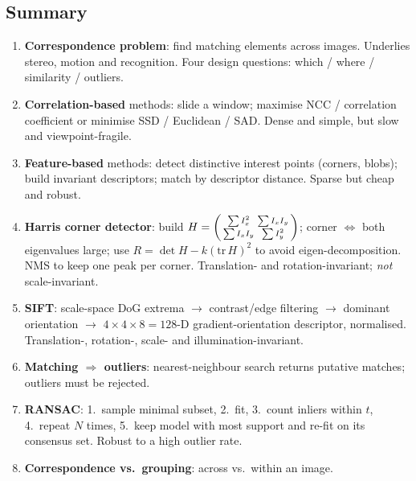\bigseparator

\subsection{Summary}

\begin{keybox}
\begin{enumerate}
  \item \textbf{Correspondence problem}: find matching elements across images. Underlies stereo, motion and recognition. Four design questions: which / where / similarity / outliers.
  \item \textbf{Correlation-based} methods: slide a window; maximise NCC / correlation coefficient or minimise SSD / Euclidean / SAD. Dense and simple, but slow and viewpoint-fragile.
  \item \textbf{Feature-based} methods: detect distinctive interest points (corners, blobs); build invariant descriptors; match by descriptor distance. Sparse but cheap and robust.
  \item \textbf{Harris corner detector}: build $H = \begin{psmallmatrix}\sum I_x^2 & \sum I_x I_y \\ \sum I_x I_y & \sum I_y^2\end{psmallmatrix}$; corner $\Leftrightarrow$ both eigenvalues large; use $R = \det H - k(\mathrm{tr}\, H)^2$ to avoid eigen-decomposition. NMS to keep one peak per corner. Translation- and rotation-invariant; \emph{not} scale-invariant.
  \item \textbf{SIFT}: scale-space DoG extrema $\to$ contrast/edge filtering $\to$ dominant orientation $\to$ $4\times 4 \times 8 = 128$-D gradient-orientation descriptor, normalised. Translation-, rotation-, scale- and illumination-invariant.
  \item \textbf{Matching $\Rightarrow$ outliers}: nearest-neighbour search returns putative matches; outliers must be rejected.
  \item \textbf{RANSAC}: 1.\ sample minimal subset, 2.\ fit, 3.\ count inliers within $t$, 4.\ repeat $N$ times, 5.\ keep model with most support and re-fit on its consensus set. Robust to a high outlier rate.
  \item \textbf{Correspondence vs.\ grouping}: across vs.\ within an image.
\end{enumerate}
\end{keybox}

